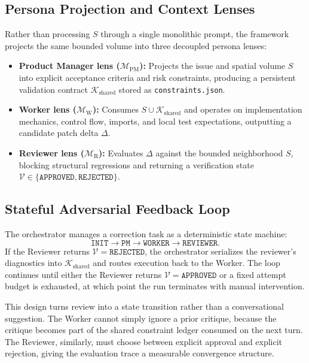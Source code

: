 \subsection{Persona Projection and Context Lenses}

Rather than processing \(S\) through a single monolithic prompt, the framework projects the same bounded volume into three decoupled persona lenses:

\begin{itemize}
    \item \textbf{Product Manager lens (\(\mathcal{M}_{\text{PM}}\)):} Projects the issue and spatial volume \(S\) into explicit acceptance criteria and risk constraints, producing a persistent validation contract \(\mathcal{K}_{\text{shared}}\) stored as \texttt{constraints.json}.
    \item \textbf{Worker lens (\(\mathcal{M}_{\text{W}}\)):} Consumes \(S \cup \mathcal{K}_{\text{shared}}\) and operates on implementation mechanics, control flow, imports, and local test expectations, outputting a candidate patch delta \(\Delta\).
    \item \textbf{Reviewer lens (\(\mathcal{M}_{\text{R}}\)):} Evaluates \(\Delta\) against the bounded neighborhood \(S\), blocking structural regressions and returning a verification state \(\mathcal{V} \in \{\texttt{APPROVED}, \texttt{REJECTED}\}\).
\end{itemize}

\subsection{Stateful Adversarial Feedback Loop}

The orchestrator manages a correction task as a deterministic state machine:
\[
\texttt{INIT} \rightarrow \texttt{PM} \rightarrow \texttt{WORKER}
\rightarrow \texttt{REVIEWER}.
\]
If the Reviewer returns \(\mathcal{V}=\texttt{REJECTED}\), the orchestrator serializes the reviewer's diagnostics into \(\mathcal{K}_{\text{shared}}\) and routes execution back to the Worker. The loop continues until either the Reviewer returns \(\mathcal{V}=\texttt{APPROVED}\) or a fixed attempt budget is exhausted, at which point the run terminates with manual intervention.

This design turns review into a state transition rather than a conversational suggestion. The Worker cannot simply ignore a prior critique, because the critique becomes part of the shared constraint ledger consumed on the next turn. The Reviewer, similarly, must choose between explicit approval and explicit rejection, giving the evaluation trace a measurable convergence structure.
